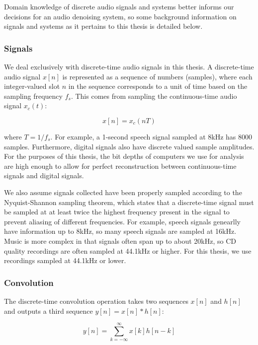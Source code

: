 Domain knowledge of discrete audio signals and systems better informs our decisions for an audio denoising system, so some background information on signals and systems as it pertains to this thesis is detailed below.

\subsubsection{Signals}
We deal exclusively with discrete-time audio signals in this thesis. A discrete-time audio signal $x[n]$ is represented as a sequence of numbers (samples), where each integer-valued slot $n$ in the sequence corresponds to a unit of time based on the sampling frequency $f_s$. This comes from sampling the continuous-time audio signal $x_c(t)$:

\begin{equation}
x[n] = x_c(nT)
\end{equation}

where $T=1/f_s$.
For example, a 1-second speech signal sampled at 8kHz has 8000 samples. Furthermore, digital signals also have discrete valued sample amplitudes. For the purposes of this thesis, the bit depths of computers we use for analysis are high enough to allow for perfect reconstruction between continuous-time signals and digital signals.

We also assume signals collected have been properly sampled according to the Nyquist-Shannon sampling theorem, which states that a discrete-time signal must be sampled at at least twice the highest frequency present in the signal to prevent aliasing of different frequencies. For example, speech signals genearlly have information up to 8kHz, so many speech signals are sampled at 16kHz. Music is more complex in that signals often span up to about 20kHz, so CD quality recordings are often sampled at 44.1kHz or higher. For this thesis, we use recordings sampled at 44.1kHz or lower.


\subsubsection{Convolution} %
The discrete-time convolution operation takes two sequences $x[n]$ and $h[n]$ and outputs a third sequence $y[n] = x[n] * h[n]$:

\begin{equation}
y[n] = \sum_{k=-\infty}^{\infty} x[k]h[n-k]
\end{equation}

